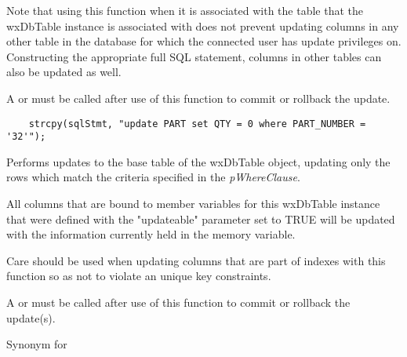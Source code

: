 Note that using this function when it is associated with the table that the 
wxDbTable instance is associated with does not prevent updating 
columns in any other table in the database for which the connected user 
has update privileges on.  Constructing the appropriate full SQL statement, 
columns in other tables can also be updated as well.

A  or 
 must be called after use of 
this function to commit or rollback the update.


\begin{verbatim}
    strcpy(sqlStmt, "update PART set QTY = 0 where PART_NUMBER = '32'");
\end{verbatim}


\label{wxdbtableupdatewhere}


Performs updates to the base table of the wxDbTable object, updating only the 
rows which match the criteria specified in the {\it pWhereClause}.

All columns that are bound to member variables for this wxDbTable instance 
that were defined with the "updateable" parameter set to TRUE will be updated 
with the information currently held in the memory variable.  




Care should be used when updating columns that are part of indexes with 
this function so as not to violate an unique key constraints.

A  or 
 must be called after use of 
this function to commit or rollback the update(s).


\label{wxdbtableplusplus}


Synonym for 




